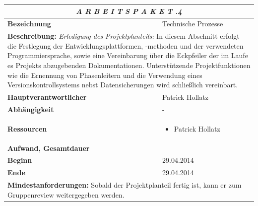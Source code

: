 \documentclass[fontsize=12pt,paper=a4,twoside]{scrartcl}
\begin{document}
\begin{tabular}{p{7.5cm}|p{7.5cm}}\toprule
\multicolumn{2}{c}{\textbf{\textit{A R B E I T S P A K E T \quad 1.1.4}}} \\ \toprule \hline
\textbf{Bezeichnung} & Technische Prozesse\\\hline
\multicolumn{2}{p{15cm}}{\textbf{Beschreibung:} \newline 
\textit{Erledigung des Projektplanteils:} In diesem Abschnitt erfolgt die Festlegung der Entwicklungsplattformen, -methoden und der verwendeten Programmiersprache, sowie eine Vereinbarung über die Eckpfeiler der im Laufe es Projekts abzugebenden Dokumentationen. Unterstützende Projektfunktionen wie die Ernennung von Phasenleitern und die Verwendung eines Versionskontrollsystems nebst Datensicherungen wird schließlich vereinbart. }  \\\hline
\textbf{Hauptverantwortlicher} & Patrick Hollatz \\\hline
\textbf{Abhängigkeit} & -\\\hline
\textbf{Ressourcen} & \begin{itemize}
\itemsep0pt
\item Patrick Hollatz
\end{itemize} \\\hline
\textbf{Aufwand, Gesamtdauer} & \\\hline
\textbf{Beginn} & 29.04.2014 \\\hline
\textbf{Ende} & 29.04.2014\\\hline
\multicolumn{2}{p{15cm}}{\textbf{Mindestanforderungen: } \newline
Sobald der Projektplanteil fertig ist, kann er zum Gruppenreview weitergegeben werden. }  \\ \toprule
\end{tabular} \\\\
\end{document}
